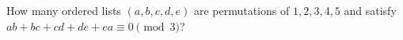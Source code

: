 How many ordered lists $(a,b,c,d,e)$ are permutations of $1,2,3,4,5$ and satisfy $ab+bc+cd+de+ea\equiv0\pmod3$?
